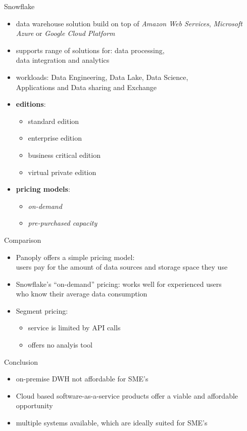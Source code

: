 \documentclass[aspectratio=169]{beamer}
\begin{document}
  \begin{frame}{Snowflake}
    \begin{itemize}
      \item data warehouse solution build on top of \textit{Amazon Web Services}, \textit{Microsoft Azure} or \textit{Google Cloud Platform}
      \item supports range of solutions for: data processing, \\
            data integration and analytics
      \item workloads: Data Engineering, Data Lake, Data Science, \\
            Applications and Data sharing and Exchange
      \item \textbf{editions}:
      \begin{itemize}
        \item standard edition
        \item enterprise edition
        \item business critical edition
        \item virtual private edition
      \end{itemize}
      \item  \textbf{pricing models}:
      \begin{itemize}
        \item \textit{on-demand}
        \item \textit{pre-purchased capacity}
      \end{itemize}
    \end{itemize}
  \end{frame}

  \begin{frame}{Comparison}
    \begin{itemize}
      \item Panoply offers a simple pricing model: \\
            users pay for the amount of data sources and storage space they use
      \item Snowflake’s “on-demand” pricing: works well for experienced users \\
            who know their average data consumption
      \item Segment pricing:
        \begin{itemize}
          \item service is limited by API calls
          \item offers no analyis tool
        \end{itemize}
    \end{itemize}
  \end{frame}

  \begin{frame}{Conclusion}
    \begin{itemize}
      \item on-premise DWH not affordable for SME’s
      \item Cloud based software-as-a-service products offer a viable and affordable opportunity
      \item multiple systems available, which are ideally suited for SME’s
    \end{itemize}
  \end{frame}
\end{document}
